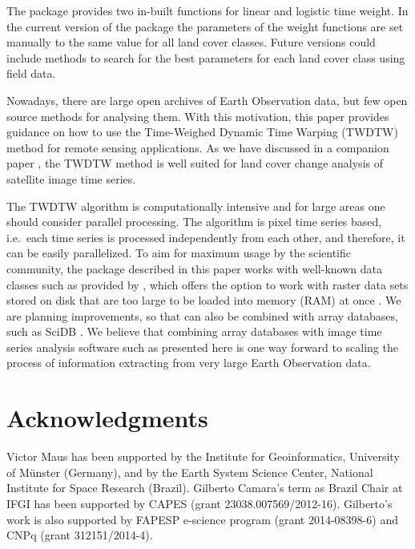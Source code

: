 \documentclass[article,shortnames]{jss}
\begin{document}
The  package provides two in-built functions for linear and
logistic time weight. In the current version of the package the
parameters of the weight functions are set manually to the same value
for all land cover classes. Future versions could include methods to
search for the best parameters for each land cover class using field
data.

Nowadays, there are large open archives of Earth Observation data, but
few open source methods for analysing them. With this motivation, this
paper provides guidance on how to use the Time-Weighed Dynamic Time
Warping (TWDTW) method for remote sensing applications. As we have
discussed in a companion paper \citep{Maus:2016}, the TWDTW method is
well suited for land cover change analysis of satellite image time
series.

The TWDTW algorithm is computationally intensive and for large areas one
should consider parallel processing. The algorithm is pixel time series
based, i.e.~each time series is processed independently from each other,
and therefore, it can be easily parallelized. To aim for maximum usage
by the scientific community, the  package described in this
paper works with well-known  data classes such as provided
by , which offers the option to work with raster data sets
stored on disk that are too large to be loaded into memory (RAM) at once
\citep{Hijmans:2015}. We are planning improvements, so that 
can also be combined with array databases, such as SciDB
\citep{Stonebraker:2013}. We believe that combining array databases with
image time series analysis software such as presented here is one way
forward to scaling the process of information extracting from very large
Earth Observation data.

\section*{Acknowledgments}

Victor Maus has been supported by the Institute for Geoinformatics,
University of Münster (Germany), and by the Earth System Science Center,
National Institute for Space Research (Brazil). Gilberto Camara's term
as Brazil Chair at IFGI has been supported by CAPES (grant
23038.007569/2012-16). Gilberto's work is also supported by FAPESP
e-science program (grant 2014-08398-6) and CNPq (grant 312151/2014-4).


\end{document}
